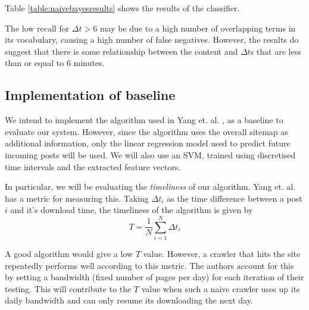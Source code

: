 \documentclass[12 pt]{article}
\begin{document}
Table \ref{table:naivebayesresults} shows the results of the classifier.


\begin{table}
	\label{table:naivebayesresults}
	\caption{Naive Bayes classification results}
\end{table}
The low recall for $\Delta t > 6$ may be due to a high number of overlapping terms in its vocabulary, causing a high number of false negatives. However, the results do suggest that there is some relationship between the content and $\Delta t$s that are less than or equal to 6 minutes. 


\subsection{Implementation of baseline}
We intend to implement the algorithm used in Yang et. al. \cite{Yang2009}, as a baseline to evaluate our system. However, since the algorithm uses the overall sitemap as additional information, only the linear regression model used to predict future incoming posts will be used. We will also use an SVM, trained using discretised time intervals and the extracted feature vectors.

In particular, we will be evaluating the \emph{timeliness} of our algorithm. Yang et. al. \cite{Yang2009} has a metric for measuring this. Taking $\Delta t_i$ as the time difference between a post $i$ and it's download time, the timeliness of the algorithm is given by
\[T = \frac{1}{N} \sum^{N}_{i=1}\Delta t_i\]

A good algorithm would give a low $T$ value. However, a crawler that hits the site repeatedly performs well according to this metric. The authors account for this by setting a bandwidth (fixed number of pages per day) for each iteration of their testing. This will contribute to the $T$ value when such a naive crawler uses up its daily bandwidth and can only resume its downloading the next day.
\end{document}
